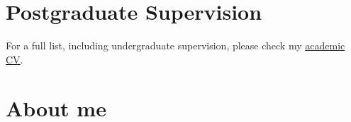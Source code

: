 \documentclass[11pt,a4paper,]{awesome-cv}
\begin{document}
\endgroup

\hypertarget{postgraduate-supervision}{%
\section{Postgraduate Supervision}\label{postgraduate-supervision}}

For a full list, including undergraduate supervision, please check my
\href{https://jdleongomez.github.io/Mile_CV/CV_eng/MVA_CV_en.pdf}{academic
CV}.

\begin{cventries}
    \vspace{-4.0mm}
    \vspace{-4.0mm}
\end{cventries}

\hypertarget{about-me-1}{%
\section{About me}\label{about-me-1}}
\end{document}
